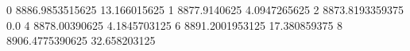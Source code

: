 0 8886.9853515625 13.166015625
1 8877.9140625 4.0947265625
2 8873.8193359375 0.0
4 8878.00390625 4.1845703125
6 8891.2001953125 17.380859375
8 8906.4775390625 32.658203125
